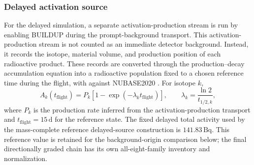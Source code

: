 \documentclass[11pt]{article}
\begin{document}
\subsubsection{Delayed activation source}
\label{subsec:delayed_source}

For the delayed simulation, a separate activation-production stream is run by
enabling BUILDUP during the prompt-background transport. This
activation-production stream is not counted as an immediate detector background.
Instead, it records the isotope, material volume, and production position of
each radioactive product. These records are converted through the
production--decay accumulation equation into a radioactive population fixed to a
chosen reference time during the flight, with 
against NUBASE2020 \cite{Kondev2021NUBASE}. For isotope $k$,
\begin{equation}
  A_k(t_{\mathrm{flight}}) = P_k\left[1-\exp\left(-\lambda_k t_{\mathrm{flight}}\right)\right],
  \qquad \lambda_k = \frac{\ln 2}{t_{1/2,k}},
\end{equation}
where $P_k$ is the production rate inferred from the activation-production
transport and $t_{\mathrm{flight}}=15\,\mathrm{d}$ for the reference state.
The fixed delayed total activity used by the mass-complete reference
delayed-source construction is $141.83\,\mathrm{Bq}$. This reference value is
retained for the background-origin comparison below; the final directionally graded chain has
its own all-eight-family inventory and normalization.
\end{document}
